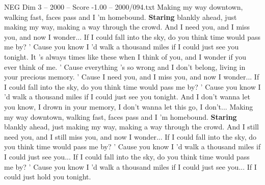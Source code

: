 \begin{textsample}{NEG Dim 3 – 2000 – Score -1.00 – 2000/094.txt}  \label{ex:f3_neg_019}
Making my way downtown, walking fast, faces pass and I 'm homebound. \textbf{Staring} blankly ahead, just making my way, making a way through the crowd.
And I need you, and I miss you, and now I wonder...
If I could fall into the sky, do you think time would pass me by? ' Cause you know I 'd walk a thousand miles if I could just see you tonight.
It 's always times like these when I think of you, and I wonder if you ever think of me. ' Cause everything 's so wrong and I don't belong, living in your precious memory. ' Cause I need you, and I miss you, and now I wonder...
If I could fall into the sky, do you think time would pass me by? ' Cause you know I 'd walk a thousand miles if I could just see you tonight.
And I don't wanna let you know, I drown in your memory, I don't wanna let this go, I don't...
Making my way downtown, walking fast, faces pass and I 'm homebound. \textbf{Staring} blankly ahead, just making my way, making a way through the crowd.
And I still need you, and I still miss you, and now I wonder...
If I could fall into the sky, do you think time would pass me by? ' Cause you know I 'd walk a thousand miles if I could just see you...
If I could fall into the sky, do you think time would pass me by? ' Cause you know I 'd walk a thousand miles if I could just see you...
If I could just hold you tonight.

\end{textsample}

